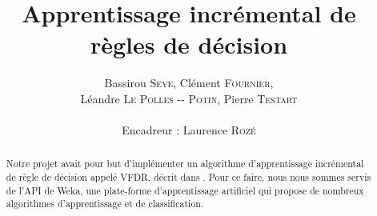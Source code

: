 \documentclass[a4paper,11pt]{article}
\title{ \textbf{Apprentissage incrémental de règles de décision} }
\author{Bassirou \textsc{Seye}, Clément \textsc{Fournier}, \\
        Léandre \textsc{Le Polles -{}- Potin}, Pierre \textsc{Testart} \\
        \\
        Encadreur : Laurence \textsc{Rozé}}
\date{}                    %
\begin{document}
          

    \maketitle                 %
    \thispagestyle{empty}      %

    \begin{abstract}
        Notre projet avait pour but d'implémenter un algorithme d'apprentissage incrémental de règle de décision appelé VFDR, décrit dans \cite{Gama-VFDR}. Pour ce faire, nous nous sommes servis de l’API de Weka, une plate-forme d'apprentissage artificiel qui propose de nombreux algorithmes d'apprentissage et de classification. 
    \end{abstract} 

    
    
    

    \nocite{*}
    
\end{document}
